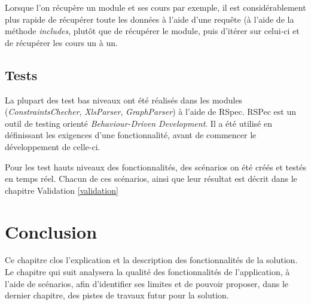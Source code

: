 Lorsque l'on récupère un module et ses cours par exemple, il est considérablement plus rapide de récupérer toute les données à l'aide d'une requête (à l'aide de la méthode \textit{includes}, plutôt que de récupérer le module, puis d'itérer sur celui-ci et de récupérer les cours un à un. 


\subsection{Tests}
La plupart des test bas niveaux ont été réalisés dans les modules (\textit{ConstraintsChecher}, \textit{XlsParser}, \textit{GraphParser}) à l'aide de RSpec. RSPec est un outil de testing orienté \textit{Behaviour-Driven Development}. Il a été utilisé en définissant les exigences d'une fonctionnalité, avant de commencer le développement de celle-ci.

Pour les test hauts niveaux des fonctionnalités, des scénarios on été créés et testés en temps réel. Chacun de ces scénarios, ainsi que leur résultat est décrit dans le chapitre Validation \ref{validation}
\section{Conclusion}

Ce chapitre clos l'explication et la description des fonctionnalités de la solution. Le chapitre qui suit analysera la qualité des fonctionnalités de l'application, à l'aide de scénarios, afin d'identifier ses limites et de pouvoir proposer, dans le dernier chapitre, des pistes de travaux futur pour la solution. 
